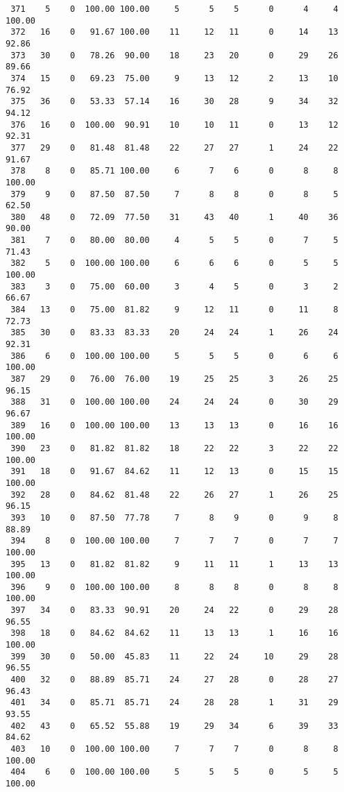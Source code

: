 \begin{verbatim}
 371    5    0  100.00 100.00     5      5    5      0      4     4   100.00
 372   16    0   91.67 100.00    11     12   11      0     14    13    92.86
 373   30    0   78.26  90.00    18     23   20      0     29    26    89.66
 374   15    0   69.23  75.00     9     13   12      2     13    10    76.92
 375   36    0   53.33  57.14    16     30   28      9     34    32    94.12
 376   16    0  100.00  90.91    10     10   11      0     13    12    92.31
 377   29    0   81.48  81.48    22     27   27      1     24    22    91.67
 378    8    0   85.71 100.00     6      7    6      0      8     8   100.00
 379    9    0   87.50  87.50     7      8    8      0      8     5    62.50
 380   48    0   72.09  77.50    31     43   40      1     40    36    90.00
 381    7    0   80.00  80.00     4      5    5      0      7     5    71.43
 382    5    0  100.00 100.00     6      6    6      0      5     5   100.00
 383    3    0   75.00  60.00     3      4    5      0      3     2    66.67
 384   13    0   75.00  81.82     9     12   11      0     11     8    72.73
 385   30    0   83.33  83.33    20     24   24      1     26    24    92.31
 386    6    0  100.00 100.00     5      5    5      0      6     6   100.00
 387   29    0   76.00  76.00    19     25   25      3     26    25    96.15
 388   31    0  100.00 100.00    24     24   24      0     30    29    96.67
 389   16    0  100.00 100.00    13     13   13      0     16    16   100.00
 390   23    0   81.82  81.82    18     22   22      3     22    22   100.00
 391   18    0   91.67  84.62    11     12   13      0     15    15   100.00
 392   28    0   84.62  81.48    22     26   27      1     26    25    96.15
 393   10    0   87.50  77.78     7      8    9      0      9     8    88.89
 394    8    0  100.00 100.00     7      7    7      0      7     7   100.00
 395   13    0   81.82  81.82     9     11   11      1     13    13   100.00
 396    9    0  100.00 100.00     8      8    8      0      8     8   100.00
 397   34    0   83.33  90.91    20     24   22      0     29    28    96.55
 398   18    0   84.62  84.62    11     13   13      1     16    16   100.00
 399   30    0   50.00  45.83    11     22   24     10     29    28    96.55
 400   32    0   88.89  85.71    24     27   28      0     28    27    96.43
 401   34    0   85.71  85.71    24     28   28      1     31    29    93.55
 402   43    0   65.52  55.88    19     29   34      6     39    33    84.62
 403   10    0  100.00 100.00     7      7    7      0      8     8   100.00
 404    6    0  100.00 100.00     5      5    5      0      5     5   100.00

\end{verbatim}

